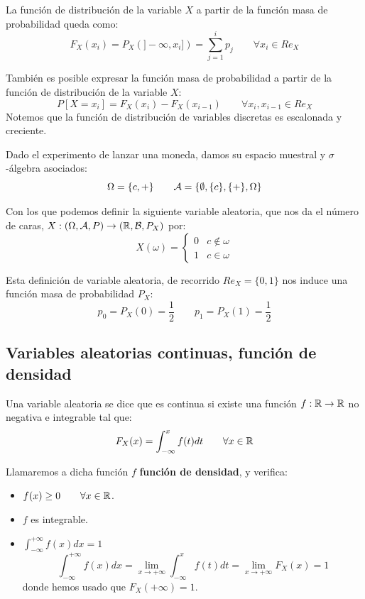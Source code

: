 La función de distribución de la variable $X$ a partir de la función masa de probabilidad queda como:
$$F_X(x_i) = P_X(]-\infty, x_i]) = \sum_{j=1}^i p_j \qquad \forall x_i \in Re_X$$


También es posible expresar la función masa de probabilidad a partir de la función de distribución de la variable $X$:
$$P[X=x_i] = F_X(x_i) - F_X(x_{i-1}) \qquad \forall x_i,x_{i-1}\in Re_X$$
Notemos que la función de distribución de variables discretas es escalonada y creciente.

\begin{ejemplo}
    Dado el experimento de lanzar una moneda, damos su espacio muestral y $\sigma$-álgebra asociados:
    $$\Omega = \{c, +\} \qquad \mathcal{A}=\{\emptyset, \{c\}, \{+\}, \Omega\}$$
    
    Con los que podemos definir la siguiente variable aleatoria, que nos da el número de caras,
    $X:(\Omega, \mathcal{A}, P) \rightarrow (\mathbb R, \mathcal{B}, P_X)$ por:
    $$X(\omega) = \left\{ \begin{array}{cc}
        0 & c \notin \omega \\
        1 & c \in \omega
    \end{array} \right.$$
    
    Esta definición de variable aleatoria, de recorrido $Re_X = \{0,1\}$ nos induce una función masa de probabilidad $P_X$:
    $$p_0 = P_X(0) = \frac{1}{2} \qquad p_1 = P_X(1) = \frac{1}{2}$$
\end{ejemplo}

\subsection{Variables aleatorias continuas, función de densidad}

\begin{definicion}
    Una variable aleatoria se dice que es continua si existe una función $f:\mathbb R \rightarrow \mathbb R$ no negativa e integrable tal que:
    $$F_X(x) = \int_{-\infty}^x f(t) dt\qquad \forall x\in \mathbb{R}$$
\end{definicion}

Llamaremos a dicha función $f$ \textbf{función de densidad}, y verifica:
\begin{itemize}
  \item $f(x) \geq 0 \qquad \forall x \in \mathbb R$.
  \item $f$ es integrable.
  \item $\displaystyle \int_{-\infty}^{+\infty}f(x) dx = 1$
  \begin{equation*}
      \int_{-\infty}^{+\infty}f(x) dx = \lim_{x\to +\infty} \int_{-\infty}^x f(t) dt = \lim_{x\to +\infty} F_X(x) = 1
  \end{equation*}
  donde hemos usado que $F_X(+\infty) = 1$.
\end{itemize}

